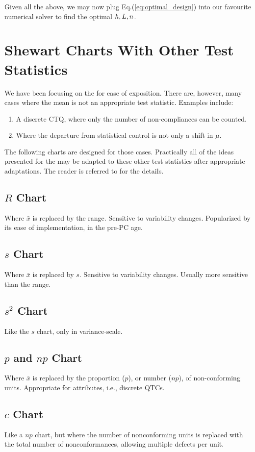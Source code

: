 Given all the above, we may now plug Eq.(\ref{eq:optimal_design}) into our favourite numerical solver to find the optimal $h,L,n$.



\section{Shewart Charts With Other Test Statistics}

We have been focusing on the \barxChart for ease of exposition. There are, however, many cases where the mean is not an appropriate test statistic.
Examples include:
\begin{enumerate}
\item A discrete CTQ, where only the number of non-compliances can be counted. 
\item Where the departure from statistical control is not only a shift in $\mu$.
\end{enumerate}

The following charts are designed for those cases. 
Practically all of the ideas presented for the \barxChart may be adapted to these other test statistics after appropriate adaptations. 
The reader is referred to \cite{montgomery_introduction_2007} for the details. 

\label{sec:other_control_charts}
\subsection{$R$ Chart}
Where $\bar{x}$ is replaced by the range. 
Sensitive to variability changes. 
Popularized by its ease of implementation, in the pre-PC age. 
\subsection{$s$ Chart}
Where $\bar{x}$ is replaced by $s$. 
Sensitive to variability changes. 
Usually more sensitive than the range.
\subsection{$s^2$ Chart}
Like the $s$ chart, only in variance-scale.
\subsection{$p$ and $np$ Chart}
Where $\bar{x}$ is replaced by the proportion ($p$), or number ($np$), of non-conforming units.
Appropriate for attributes, i.e., discrete QTCs.
\subsection{$c$ Chart}
Like a $np$ chart, but where the number of nonconforming units is replaced with the total number of nonconformances, allowing multiple defects per unit. 
